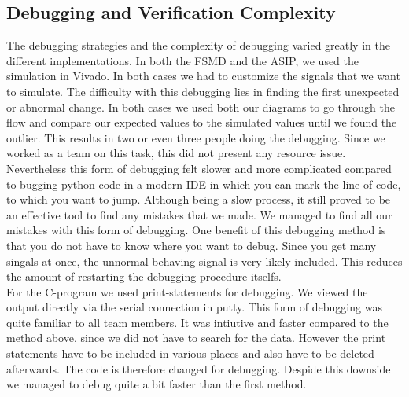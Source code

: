 \documentclass[conference]{IEEEtran}
\begin{document}
\subsection{Debugging and Verification Complexity}
The debugging strategies and the complexity of debugging varied greatly in the different implementations. In both the FSMD and the ASIP, we used the simulation in Vivado. In both cases we had to customize the signals that we want to simulate. The difficulty with this debugging lies in finding the first unexpected or abnormal change. In both cases we used both our diagrams to go through the flow and compare our expected values to the simulated values until we found the outlier. This results in two or even three people doing the debugging. Since we worked as a team on this task, this did not present any resource issue. Nevertheless this form of debugging felt slower and more complicated compared to bugging python code in a modern IDE in which you can mark the line of code, to which you want to jump. Although being a slow process, it still proved to be an effective tool to find any mistakes that we made. We managed to find all our mistakes with this form of debugging. One benefit of this debugging method is that you do not have to know where you want to debug. Since you get many singals at once, the unnormal behaving signal is very likely included. This reduces the amount of restarting the debugging procedure itselfs. \\
For the C-program we used print-statements for debugging. We viewed the output directly via the serial connection in putty. This form of debugging was quite familiar to all team members. It was intiutive and faster compared to the method above, since we did not have to search for the data. However the print statements have to be included in various places and also have to be deleted afterwards. The code is therefore changed for debugging. Despide this downside we managed to debug quite a bit faster than the first method. \\
\end{document}
